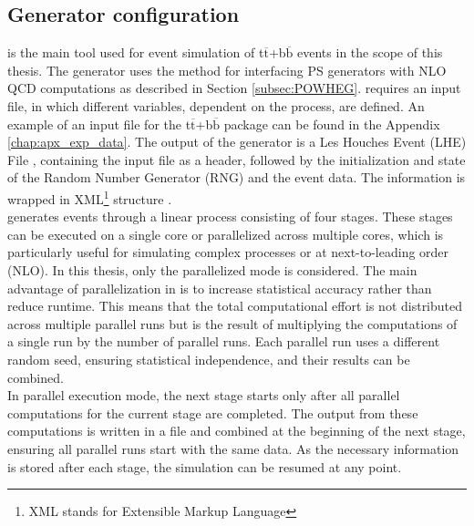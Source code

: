 
\subsection{\label{generator}Generator configuration}
 \cite{Jezo:2015aia} is the main tool used for event simulation of t$\overline{\text{t}}$+b$\overline{\text{b}}$ events in the scope of this thesis. The generator uses the {\selectfont{Powheg}} method for interfacing PS generators with NLO QCD computations as described in Section \ref{subsec:POWHEG}. {\selectfont{Powheg Box Res}} requires an input file, in which different variables, dependent on the process, are defined. An example of an input file for the t$\overline{\text{t}}$+b$\overline{\text{b}}$ package can be found in the Appendix \ref{chap:apx_exp_data}. The output of the generator is a Les Houches Event (LHE) File \cite{LHE}, containing the input file as a header, followed by the initialization and state of the Random Number Generator (RNG) and the event data. The information is wrapped in XML\footnote{XML stands for Extensible Markup Language} structure \cite{XML}.\\
 generates events through a linear process consisting of four stages. These stages can be executed on a single core or parallelized across multiple cores, which is particularly useful for simulating complex processes or at next-to-leading order (NLO). In this thesis, only the parallelized mode is considered. The main advantage of parallelization in {\selectfont{Powheg Box Res}} is to increase statistical accuracy rather than reduce runtime. This means that the total computational effort is not distributed across multiple parallel runs but is the result of multiplying the computations of a single run by the number of parallel runs. Each parallel run uses a different random seed, ensuring statistical independence, and their results can be combined.\\ 
\indent In parallel execution mode, the next stage starts only after all parallel computations for the current stage are completed. The output from these computations is written in a file and combined at the beginning of the next stage, ensuring all parallel runs start with the same data. As the necessary information is stored after each stage, the simulation can be resumed at any point.\\
